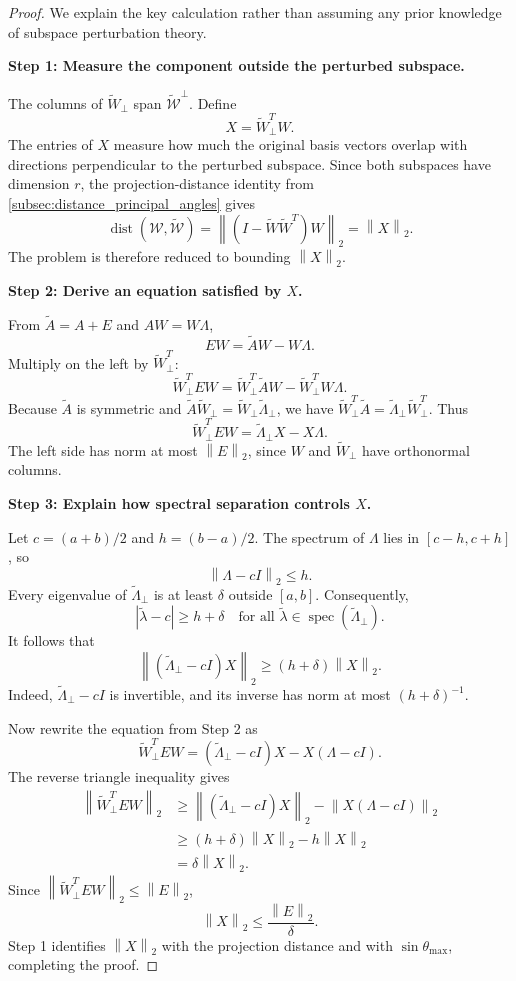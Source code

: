 \documentclass[14pt,letterpaper]{article}
\theoremstyle{plain}
\theoremstyle{definition}
\theoremstyle{remark}
\newcommand{\norm}[1]{\left\lVert #1 \right\rVert}
\newcommand{\abs}[1]{\left| #1 \right|}
\DeclareMathOperator{\dist}{dist}
\DeclareMathOperator{\spec}{spec}
\begin{document}
\begin{proof}
We explain the key calculation rather than assuming
any prior knowledge of subspace perturbation theory.

\medskip
\noindent\textbf{Step 1: Measure the component outside the perturbed subspace.}

The columns of $\widetilde W_\perp$ span
$\widetilde{\mathcal W}^{\perp}$. Define
\[
\boxed{X=\widetilde W_\perp^T W.}
\]
The entries of $X$ measure how much the original
basis vectors overlap with directions perpendicular
to the perturbed subspace. Since both subspaces have
dimension $r$, the projection-distance identity
from \cref{subsec:distance_principal_angles} gives
\[
\boxed{
\dist(\mathcal W,\widetilde{\mathcal W})
=\norm{(I-\widetilde W\widetilde W^T)W}_2
=\norm{X}_2.
}
\]
The problem is therefore reduced to bounding $\norm{X}_2$.

\medskip
\noindent\textbf{Step 2: Derive an equation satisfied by $X$.}

From $\widetilde A=A+E$ and $AW=W\Lambda$,
\[
EW=\widetilde A W-W\Lambda.
\]
Multiply on the left by $\widetilde W_\perp^T$:
\[
\widetilde W_\perp^T EW
=\widetilde W_\perp^T\widetilde A W
  -\widetilde W_\perp^T W\Lambda.
\]
Because $\widetilde A$ is symmetric and
$\widetilde A\widetilde W_\perp
=\widetilde W_\perp\widetilde\Lambda_\perp$,
we have
$\widetilde W_\perp^T\widetilde A
=\widetilde\Lambda_\perp\widetilde W_\perp^T$.
Thus
\[
\boxed{
\widetilde W_\perp^T EW
=\widetilde\Lambda_\perp X-X\Lambda.
}
\]
The left side has norm at most $\norm{E}_2$, since
$W$ and $\widetilde W_\perp$ have orthonormal columns.

\medskip
\noindent\textbf{Step 3: Explain how spectral separation controls $X$.}

Let $c=(a+b)/2$ and $h=(b-a)/2$. The spectrum of
$\Lambda$ lies in $[c-h,c+h]$, so
\[
\norm{\Lambda-cI}_2\leq h.
\]
Every eigenvalue of $\widetilde\Lambda_\perp$ is
at least $\delta$ outside $[a,b]$. Consequently,
\[
\abs{\widetilde\lambda-c}\geq h+\delta
\quad\text{for all }
\widetilde\lambda\in\spec(\widetilde\Lambda_\perp).
\]
It follows that
\[
\norm{(\widetilde\Lambda_\perp-cI)X}_2
\geq(h+\delta)\norm{X}_2.
\]
Indeed, $\widetilde\Lambda_\perp-cI$ is invertible,
and its inverse has norm at most $(h+\delta)^{-1}$.

Now rewrite the equation from Step 2 as
\[
\widetilde W_\perp^T EW
=(\widetilde\Lambda_\perp-cI)X
-X(\Lambda-cI).
\]
The reverse triangle inequality gives
\[
\begin{aligned}
\norm{\widetilde W_\perp^T EW}_2
&\geq\norm{(\widetilde\Lambda_\perp-cI)X}_2
      -\norm{X(\Lambda-cI)}_2\\
&\geq(h+\delta)\norm{X}_2-h\norm{X}_2\\
&=\delta\norm{X}_2.
\end{aligned}
\]
Since $\norm{\widetilde W_\perp^T EW}_2\leq\norm{E}_2$,
\[
\boxed{\norm{X}_2\leq\frac{\norm{E}_2}{\delta}.}
\]
Step 1 identifies $\norm{X}_2$ with the projection
distance and with $\sin\theta_{\max}$, completing
the proof.
\end{proof}
\end{document}
